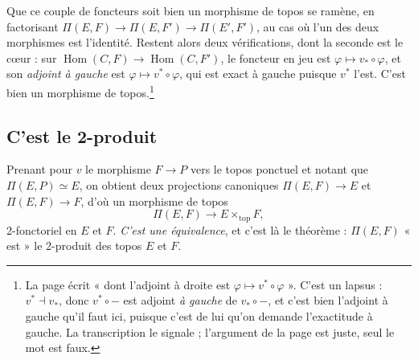 \documentclass[11pt,a4paper]{article}
\begin{document}
Que ce couple de foncteurs soit bien un morphisme de topos se ramène, en
factorisant $\Pi(E,F) \to \Pi(E,F') \to \Pi(E',F')$, au cas où l'un des deux
morphismes est l'identité. Restent alors deux vérifications, dont la seconde
est le cœur : sur $\operatorname{Hom}(C, F) \to \operatorname{Hom}(C, F')$, le
foncteur en jeu est $\varphi \mapsto v_{*} \circ \varphi$, et son \emph{adjoint
à gauche} est $\varphi \mapsto v^{*} \circ \varphi$, qui est exact à gauche
puisque $v^{*}$ l'est. C'est bien un morphisme de topos.\footnote{La page écrit
« dont l'adjoint à droite est $\varphi \mapsto v^{*} \circ \varphi$ ». C'est un
lapsus : $v^{*} \dashv v_{*}$, donc $v^{*} \circ -$ est adjoint \emph{à gauche}
de $v_{*} \circ -$, et c'est bien l'adjoint à gauche qu'il faut ici, puisque
c'est de lui qu'on demande l'exactitude à gauche. La transcription le signale ;
l'argument de la page est juste, seul le mot est faux.}

\subsection*{C'est le 2-produit}

Prenant pour $v$ le morphisme $F \to P$ vers le topos ponctuel et notant que
$\Pi(E,P) \simeq E$, on obtient deux projections canoniques $\Pi(E,F) \to E$ et
$\Pi(E,F) \to F$, d'où un morphisme de topos
\[
\Pi(E,F) \longrightarrow E \times_{\mathrm{top}} F,
\]
2-fonctoriel en $E$ et $F$. \emph{C'est une équivalence}, et c'est là le
théorème : $\Pi(E,F)$ « est » le 2-produit des topos $E$ et $F$.
\end{document}
